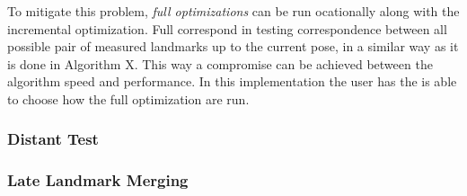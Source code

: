 To mitigate this problem, \emph{full optimizations} can be run ocationally along with the incremental optimization. Full correspond in testing correspondence between all possible pair of measured landmarks up to the current pose, in a similar way as it is done in Algorithm X. This way a compromise can be achieved between the algorithm speed and performance. In this implementation the user has the is able to choose how the full optimization are run.

\subsubsection{Distant Test}

\subsubsection{Late Landmark Merging}
